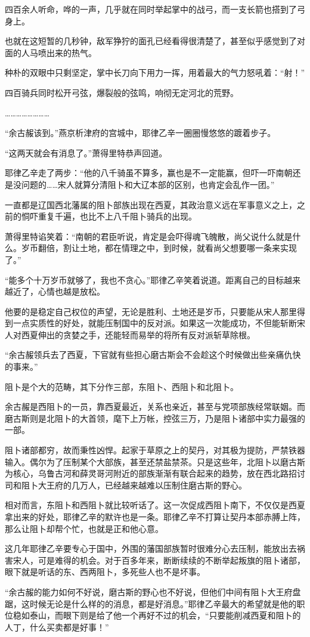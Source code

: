 四百余人听命，哗的一声，几乎就在同时举起掌中的战弓，而一支长箭也搭到了弓身上。

也就在这短暂的几秒钟，敌军狰狞的面孔已经看得很清楚了，甚至似乎感觉到了对面的人马喷出来的热气。

种朴的双眼中只剩坚定，掌中长刀向下用力一挥，用着最大的气力怒吼着：“射！”

四百骑兵同时松开弓弦，爆裂般的弦鸣，响彻无定河北的荒野。

……………………

“余古赧该到。”燕京析津府的宫城中，耶律乙辛一圈圈慢悠悠的踱着步子。

“这两天就会有消息了。”萧得里特恭声回道。

耶律乙辛走了两步：“他的八千骑虽不算多，赢也是不一定能赢，但吓一吓南朝还是没问题的……宋人就算分清阻卜和大辽本部的区别，也肯定会乱作一团。”

一直都是辽国西北藩属的阻卜部族出现在西夏，其政治意义远在军事意义之上，之前的恫吓重复千遍，也比不上八千阻卜骑兵的出现。

萧得里特谄笑着：“南朝的君臣听说，肯定是会吓得魂飞魄散，尚父说什么就是什么。岁币翻倍，割让土地，都在情理之中，到时候，就看尚父想要哪一条来实现了。”

“能多个十万岁币就够了，我也不贪心。”耶律乙辛笑着说道。距离自己的目标越来越近了，心情也越是放松。

他要的是稳定自己权位的声望，无论是胜利、土地还是岁币，只要能从宋人那里得到一点实质性的好处，就能压制国中的反对派。如果这一次能成功，不但能斩断宋人对西夏伸出的贪婪之手，还能轻而易举的将所有反对派斩草除根。

“余古赧领兵去了西夏，下官就有些担心磨古斯会不会趁这个时候做出些亲痛仇快的事来。”

阻卜是个大的范畴，其下分作三部，东阻卜、西阻卜和北阻卜。

余古赧是西阻卜的一员，靠西夏最近，关系也亲近，甚至与党项部族经常联姻。而磨古斯则是北阻卜的大首领，麾下上万帐，控弦三万，乃是阻卜诸部中实力最强的一部。

阻卜诸部都穷，故而秉性凶悍。起家于草原之上的契丹，对其极为提防，严禁铁器输入。偶尔为了压制某个大部族，甚至还禁盐禁茶。只是这些年，北阻卜以磨古斯为核心，乌鲁古河和薛灵哥河附近的部族渐渐有联合起来的趋势，放在西北路招讨司和阻卜大王府的几万人，已经越来越难以压制住磨古斯的野心。

相对而言，东阻卜和西阻卜就比较听话了。这一次促成西阻卜南下，不仅仅是西夏拿出来的好处，耶律乙辛的默许也是一条。耶律乙辛不打算让契丹本部赤膊上阵，那么让阻卜却帮个忙，也就是正和他心意。

这几年耶律乙辛要专心于国中，外围的藩国部族暂时很难分心去压制，能放出去祸害宋人，可是难得的机会。对于百多年来，断断续续的不断举起叛旗的阻卜诸部，眼下就是听话的东、西两阻卜，多死些人也不是坏事。

“余古赧的能力如何不好说，磨古斯的野心也不好说，但他们中间有阻卜大王府盘踞，这时候无论是什么样的的消息，都是好消息。”耶律乙辛最大的希望就是他的职位稳如泰山，而眼下则是给了他一个再好不过的机会，“只要能削减西夏和阻卜的人丁，什么买卖都是好事！”

